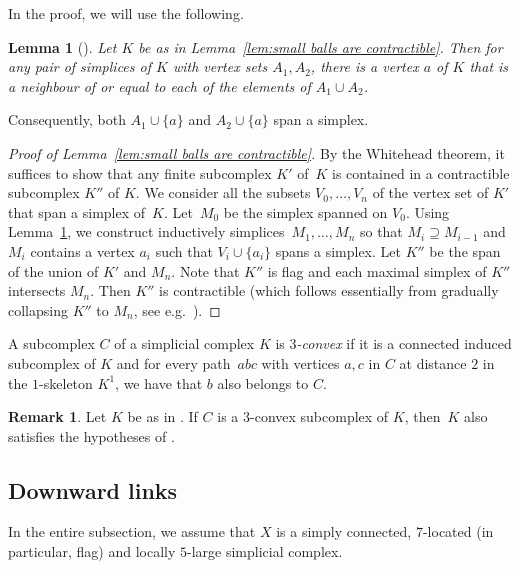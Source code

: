 \documentclass[a4paper,12pt,leqno]{amsart}
\newtheorem{lemma}[thm]{Lemma}
\theoremstyle{definition}
\newtheorem{remark}[thm]{Remark}
\begin{document}
In the proof, we will use the following.

\begin{lemma}[{\cite[Lem~8.11]{HP}}]
\label{lem:HP}
Let $K$ be as in Lemma~\ref{lem:small balls are contractible}. Then for any pair of simplices of $K$ with vertex sets $A_1,A_2$, there is a vertex $a$ of $K$ that is a neighbour of or equal to each of the elements of $A_1\cup A_2$. 
\end{lemma}

Consequently, both  $A_1\cup \{a\}$ and $A_2\cup \{a\}$ span a simplex. 

\begin{proof}[Proof of Lemma~\ref{lem:small balls are contractible}]
By the Whitehead theorem, it suffices to show that any finite subcomplex $K'$ of~$K$ is contained in a contractible subcomplex $K''$ of $K$. We consider all the subsets $V_0,\ldots, V_n$ of the vertex set of $K'$ that span a simplex of~$K$. Let~$M_0$ be the simplex spanned on $V_0$. Using Lemma~\ref{lem:HP}, we construct inductively simplices~$M_1,\ldots, M_n$ so that $M_i\supseteq M_{i-1}$ and $M_i$ contains a vertex $a_i$ such that $V_i\cup \{a_i\}$ spans a simplex. Let $K''$ be the span of the union of $K'$ and $M_n$. Note that $K''$ is flag and each maximal simplex of $K''$ intersects $M_n$. Then $K''$ is contractible (which follows essentially from gradually collapsing $K''$ to $M_n$, see e.g.\ \cite[Lem~8.13]{HP}). 
\end{proof}

A subcomplex $C$ of a simplicial complex $K$ is \emph{$3$-convex} if it is a connected induced subcomplex of $K$ and for every path~$abc$ with vertices $a,c$ in $C$ at distance $2$ in the $1$-skeleton $K^1$, we have that $b$ also belongs to $C$. 


\begin{remark} \label{lem:3-convex is contractable}
    Let $K$ be as in . If $C$ is a $3$-convex subcomplex of $K$, then~$K$ also satisfies the hypotheses of .
\end{remark}



\subsection{Downward links}
In the entire subsection, we assume that $X$ is a simply connected, $7$-located (in particular, flag) and locally $5$-large simplicial complex.
\end{document}
